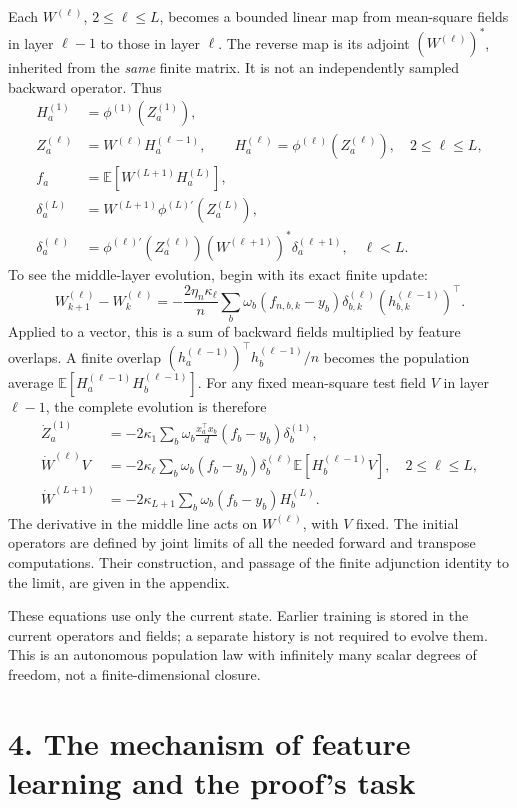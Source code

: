 Each $W^{(\ell)}$, $2\le\ell\le L$, becomes a bounded linear map from
mean-square fields in layer $\ell-1$ to those in layer $\ell$. The reverse
map is its adjoint $(W^{(\ell)})^*$, inherited from the \emph{same} finite
matrix. It is not an independently sampled backward operator. Thus
\[
\begin{aligned}
H_a^{(1)}&=\phi^{(1)}(Z_a^{(1)}),\\
Z_a^{(\ell)}&=W^{(\ell)}H_a^{(\ell-1)},\qquad
H_a^{(\ell)}=\phi^{(\ell)}(Z_a^{(\ell)}),\quad 2\le\ell\le L,\\
f_a&=\mathbb E[W^{(L+1)}H_a^{(L)}],\\
\delta_a^{(L)}&=W^{(L+1)}\phi^{(L)\prime}(Z_a^{(L)}),\\
\delta_a^{(\ell)}&=\phi^{(\ell)\prime}(Z_a^{(\ell)})
             (W^{(\ell+1)})^*\delta_a^{(\ell+1)},\quad\ell<L.
\end{aligned}
\]
To see the middle-layer evolution, begin with its exact finite update:
\[
W_{k+1}^{(\ell)}-W_k^{(\ell)}
=-\frac{2\eta_n\kappa_\ell}{n}
\sum_b\omega_b(f_{n,b,k}-y_b)
\delta_{b,k}^{(\ell)}(h_{b,k}^{(\ell-1)})^\top.
\]
Applied to a vector, this is a sum of backward fields multiplied by
feature overlaps. A finite overlap
$(h_a^{(\ell-1)})^\top h_b^{(\ell-1)}/n$ becomes the population average
$\mathbb E[H_a^{(\ell-1)}H_b^{(\ell-1)}]$.
For any fixed mean-square test field $V$ in layer $\ell-1$, the complete
evolution is therefore
\[
\begin{aligned}
\dot Z_a^{(1)}
 &=-2\kappa_1\sum_b\omega_b\frac{x_a^\top x_b}{d}
          (f_b-y_b)\delta_b^{(1)},\\
\dot W^{(\ell)}V
 &=-2\kappa_\ell\sum_b\omega_b(f_b-y_b)
          \delta_b^{(\ell)}\mathbb E[H_b^{(\ell-1)}V],\quad 2\le\ell\le L,\\
\dot W^{(L+1)}
 &=-2\kappa_{L+1}\sum_b\omega_b(f_b-y_b)H_b^{(L)}.
\end{aligned}
\]
The derivative in the middle line acts on $W^{(\ell)}$, with $V$ fixed.
The initial operators are defined by joint limits of all the needed forward
and transpose computations. Their construction, and passage of the finite
adjunction identity to the limit, are given in the appendix.

These equations use only the current state. Earlier training is stored in
the current operators and fields; a separate history is not required to
evolve them. This is an autonomous population law with infinitely many
scalar degrees of freedom, not a finite-dimensional closure.

\newpage
\section*{4. The mechanism of feature learning and the proof's task}

